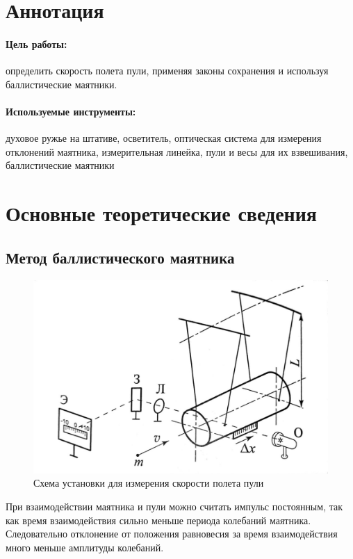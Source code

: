 \documentclass[a4paper,12pt]{article}
\begin{document}
	
	\newpage
	
	\section{Аннотация}
	\paragraph{Цель работы:} \hspace{-4mm} определить скорость полета пули, применяя законы сохранения и используя баллистические маятники.
	\paragraph{Используемые инструменты:} \hspace{-4mm} духовое ружье на штативе, осветитель, оптическая система для измерения отклонений маятника, измерительная линейка, пули и весы для их взвешивания, баллистические маятники\\
	\section{Основные теоретические сведения}
	\subsection{Метод баллистического маятника}
	
	\begin{figure}[H]
		\centering
		\includegraphics[width=0.7\linewidth]{ball}
		\caption{Схема установки для измерения скорости полета пули}
		\label{fig:ball}
	\end{figure}
	
	При взаимодействии маятника и пули можно считать импульс постоянным, так как время взаимодействия сильно меньше периода колебаний маятника. Следовательно отклонение от положения равновесия за время взаимодействия много меньше амплитуды колебаний.\\
	
\end{document}
